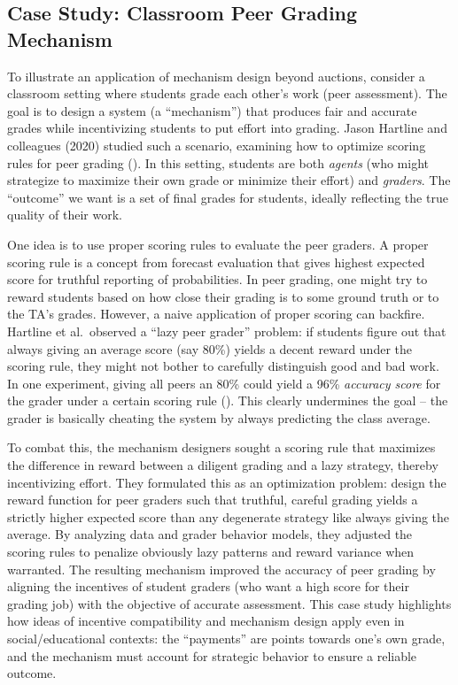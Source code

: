 \documentclass[
  letterpaper,
  numbers=noenddot,
  DIV=11]{scrreprt}
\theoremstyle{definition}
\theoremstyle{plain}
\theoremstyle{plain}
\theoremstyle{remark}
\begin{document}
\subsection{Case Study: Classroom Peer Grading
Mechanism}\label{case-study-classroom-peer-grading-mechanism}

To illustrate an application of mechanism design beyond auctions,
consider a classroom setting where students grade each other's work
(peer assessment). The goal is to design a system (a ``mechanism'') that
produces fair and accurate grades while incentivizing students to put
effort into grading. Jason Hartline and colleagues (2020) studied such a
scenario, examining how to optimize scoring rules for peer grading
(). In this setting,
students are both \emph{agents} (who might strategize to maximize their
own grade or minimize their effort) and \emph{graders}. The ``outcome''
we want is a set of final grades for students, ideally reflecting the
true quality of their work.

One idea is to use proper scoring rules to evaluate the peer graders. A
proper scoring rule is a concept from forecast evaluation that gives
highest expected score for truthful reporting of probabilities. In peer
grading, one might try to reward students based on how close their
grading is to some ground truth or to the TA's grades. However, a naive
application of proper scoring can backfire. Hartline et al.~observed a
``lazy peer grader'' problem: if students figure out that always giving
an average score (say 80\%) yields a decent reward under the scoring
rule, they might not bother to carefully distinguish good and bad work.
In one experiment, giving all peers an 80\% could yield a 96\%
\emph{accuracy score} for the grader under a certain scoring rule
(). This clearly
undermines the goal -- the grader is basically cheating the system by
always predicting the class average.

To combat this, the mechanism designers sought a scoring rule that
maximizes the difference in reward between a diligent grading and a lazy
strategy, thereby incentivizing effort. They formulated this as an
optimization problem: design the reward function for peer graders such
that truthful, careful grading yields a strictly higher expected score
than any degenerate strategy like always giving the average. By
analyzing data and grader behavior models, they adjusted the scoring
rules to penalize obviously lazy patterns and reward variance when
warranted. The resulting mechanism improved the accuracy of peer grading
by aligning the incentives of student graders (who want a high score for
their grading job) with the objective of accurate assessment. This case
study highlights how ideas of incentive compatibility and mechanism
design apply even in social/educational contexts: the ``payments'' are
points towards one's own grade, and the mechanism must account for
strategic behavior to ensure a reliable outcome.
\end{document}
